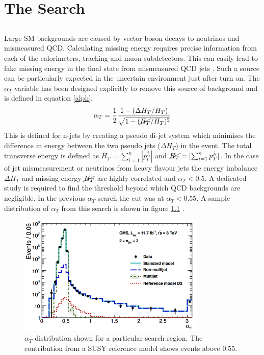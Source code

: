 
\chapter{The \alphat Search} %

\label{Chapter3} %



\section{\boldsymbol{\alphat}}
Large SM backgrounds are caused by vector boson decays to neutrinos and mismeasured QCD. Calculating missing energy requires precise information from each of the calorimeters, tracking and muon subdetectors. This can easily lead to fake missing energy in the final state from mismeasured QCD jets \cite{randall}. Such a source can be particularly expected in the uncertain environment just after turn on.  The $\alpha_T$ variable has been designed explicitly to remove this source of background and is defined in equation \ref{alph}.
\begin{equation}
\label{alph}
\alpha_T=\frac{1}{2}\frac{1-(\Delta H_T/H_T)}{\sqrt{1-(\cancel{H_T}/H_T)^2}}
\end{equation}
This is defined for n-jets by creating a pseudo di-jet system which minimises the difference in energy between the two pseudo jets ($\Delta H_T$) in the event. The total transverse energy is defined as $H_T=\sum_{i=1}^n|p_t^{j_i}|$ and $\cancel{H_T}=|{\sum_{i=1}^n p_T^{j_i}}|$. In the case of jet mismeasurement or neutrinos from heavy flavour jets the energy imbalance $\Delta H_T$ and missing energy $\cancel{H_T}$ are highly correlated and $\alpha_T<0.5$. A dedicated study is required to find the threshold beyond which QCD backgrounds are negligible. In the previous $\alpha_T$ search the cut was at $\alpha_T<0.55$. A sample distribution of $\alpha_T$ from this search is shown in figure \ref{alphdis} \cite{CMSAT8}.
\begin{figure}
\centering
    \includegraphics[width=0.8\textwidth]{Figures/sample_aT.jpg}
  \caption{$\alpha_T$ distribution shown for a particular search region. The contribution from a SUSY reference model shows events above 0.55.}
  \label{alphdis}
\end{figure}

